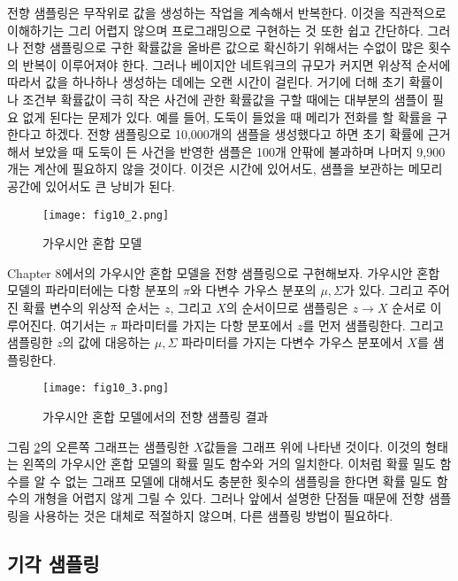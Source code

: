 \documentclass[a4paper]{oblivoir}
\begin{document}
전향 샘플링은 무작위로 값을 생성하는 작업을 계속해서 반복한다. 이것을 직관적으로 이해하기는 그리 어렵지 않으며 프로그래밍으로 구현하는 것 또한 쉽고 간단하다. 그러나 전향 샘플링으로 구한 확률값을 올바른 값으로 확신하기 위해서는 수없이 많은 횟수의 반복이 이루어져야 한다. 그러나 베이지안 네트워크의 규모가 커지면 위상적 순서에 따라서 값을 하나하나 생성하는 데에는 오랜 시간이 걸린다. 거기에 더해 초기 확률이나 조건부 확률값이 극히 작은 사건에 관한 확률값을 구할 때에는 대부분의 샘플이 필요 없게 된다는 문제가 있다. 예를 들어, 도둑이 들었을 때 메리가 전화를 할 확률을 구한다고 하겠다. 전향 샘플링으로 10,000개의 샘플을 생성했다고 하면 초기 확률에 근거해서 보았을 때 도둑이 든 사건을 반영한 샘플은 100개 안팎에 불과하며 나머지 9,900개는 계산에 필요하지 않을 것이다. 이것은 시간에 있어서도, 샘플을 보관하는 메모리 공간에 있어서도 큰 낭비가 된다.   \\

\begin{figure}[ht] \centering 
\texttt{[image: fig10\_2.png]} 
\caption{가우시안 혼합 모델}
\label{fig:10-2}
\end{figure} 

Chapter 8에서의 가우시안 혼합 모델을 전향 샘플링으로 구현해보자. 가우시안 혼합 모델의 파라미터에는 다항 분포의 $\pi$와 다변수 가우스 분포의 $\mu, \Sigma$가 있다. 그리고 주어진 확률 변수의 위상적 순서는 $z$, 그리고 $X$의 순서이므로 샘플링은 $z \to X$ 순서로 이루어진다. 여기서는 $\pi$ 파라미터를 가지는 다항 분포에서 $z$를 먼저 샘플링한다. 그리고 샘플링한 $z$의 값에 대응하는 $\mu, \Sigma$ 파라미터를 가지는 다변수 가우스 분포에서 $X$를 샘플링한다. \\

\begin{figure}[ht] \centering 
\texttt{[image: fig10\_3.png]} 
\caption{가우시안 혼합 모델에서의 전향 샘플링 결과}
\label{fig:10-3}
\end{figure}  

그림 \ref{fig:10-3}의 오른쪽 그래프는 샘플링한 $X$값들을 그래프 위에 나타낸 것이다. 이것의 형태는 왼쪽의 가우시안 혼합 모델의 확률 밀도  함수와 거의 일치한다. 이처럼 확률 밀도 함수를 알 수 없는 그래프 모델에 대해서도 충분한 횟수의 샘플링을 한다면 확률 밀도 함수의 개형을 어렵지 않게 그릴 수 있다. 그러나 앞에서 설명한 단점들 때문에 전향 샘플링을 사용하는 것은 대체로 적절하지 않으며, 다른 샘플링 방법이 필요하다. 

\subsection{기각 샘플링}
\end{document}
